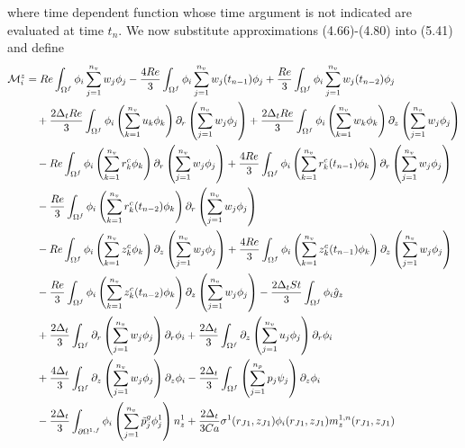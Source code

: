 \documentclass{article}
\begin{document}
where time dependent function whose time argument is not indicated are evaluated at time $t_n$.
We now substitute approximations (4.66)-(4.80) into (5.41) and define
\begin{align}
\mathcal{M}_i^z &= Re \int_{\Omega^f} \phi_i \sum_{j=1}^{n_v} w_j \phi_j - \frac{4Re}{3} \int_{\Omega^f} \phi_i \sum_{j=1}^{n_v} w_j(t_{n-1}) \phi_j + \frac{Re}{3} \int_{\Omega^f} \phi_i \sum_{j=1}^{n_v} w_j(t_{n-2}) \phi_j \nonumber\\
&\quad + \frac{2\dt Re}{3} \int_{\Omega^f} \phi_i \left( \sum_{k=1}^{n_v} u_k \phi_k \right) \partial_r \left( \sum_{j=1}^{n_v} w_j \phi_j \right) + \frac{2\dt Re}{3} \int_{\Omega^f} \phi_i \left( \sum_{k=1}^{n_v} w_k \phi_k \right) \partial_z \left( \sum_{j=1}^{n_v} w_j \phi_j \right) \nonumber\\
&\quad - Re \int_{\Omega^f} \phi_i \left( \sum_{k=1}^{n_v} r_k^c \phi_k \right) \partial_r \left( \sum_{j=1}^{n_v} w_j \phi_j \right) + \frac{4Re}{3} \int_{\Omega^f} \phi_i \left( \sum_{k=1}^{n_v} r_k^c(t_{n-1}) \phi_k \right) \partial_r \left( \sum_{j=1}^{n_v} w_j \phi_j \right) \nonumber\\
&\quad - \frac{Re}{3} \int_{\Omega^f} \phi_i \left( \sum_{k=1}^{n_v} r_k^c(t_{n-2}) \phi_k \right) \partial_r \left( \sum_{j=1}^{n_v} w_j \phi_j \right) \nonumber\\
&\quad - Re \int_{\Omega^f} \phi_i \left( \sum_{k=1}^{n_v} z_k^c \phi_k \right) \partial_z \left( \sum_{j=1}^{n_v} w_j \phi_j \right) + \frac{4Re}{3} \int_{\Omega^f} \phi_i \left( \sum_{k=1}^{n_v} z_k^c(t_{n-1}) \phi_k \right) \partial_z \left( \sum_{j=1}^{n_v} w_j \phi_j \right) \nonumber\\
&\quad - \frac{Re}{3} \int_{\Omega^f} \phi_i \left( \sum_{k=1}^{n_v} z_k^c(t_{n-2}) \phi_k \right) \partial_z \left( \sum_{j=1}^{n_v} w_j \phi_j \right) - \frac{2\dt St}{3} \int_{\Omega^f} \phi_i \hat{g}_z \nonumber\\
&\quad + \frac{2\dt}{3} \int_{\Omega^f} \partial_r \left( \sum_{j=1}^{n_v} w_j \phi_j \right) \partial_r \phi_i + \frac{2\dt}{3} \int_{\Omega^f} \partial_z \left( \sum_{j=1}^{n_v} u_j \phi_j \right) \partial_r \phi_i \nonumber\\
&\quad + \frac{4\dt}{3} \int_{\Omega^f} \partial_z \left( \sum_{j=1}^{n_v} w_j \phi_j \right) \partial_z \phi_i - \frac{2\dt}{3} \int_{\Omega^f} \left( \sum_{j=1}^{n_p} p_j \psi_j \right) \partial_z \phi_i \nonumber\\
&\quad - \frac{2\dt}{3} \int_{\partial \Omega^{1,f}} \phi_i \left( \sum_{j=1}^{n_v} \tilde{p}_j^g \phi_j^1 \right) n_z^1 + \frac{2\dt}{3\ca} \sigma^1(r_{J1},z_{J1}) \phi_i(r_{J1},z_{J1}) m_z^{1,n}(r_{J1},z_{J1}) \nonumber\\

\end{align}
\end{document}
